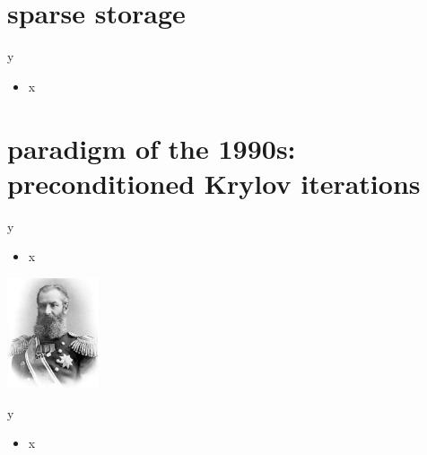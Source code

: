 \documentclass[10pt,
               svgnames,
               hyperref={colorlinks,citecolor=DeepPink4,linkcolor=FireBrick,urlcolor=Maroon},
               usepdftitle=false]{beamer}
\begin{document}
\section{sparse storage}

\begin{frame}{y}

\begin{itemize}
\item x
\end{itemize}
\end{frame}


\section{paradigm of the 1990s: preconditioned Krylov iterations}

\begin{frame}{y}

\begin{itemize}
\item x
\end{itemize}

\hfill \includegraphics[width=0.2\textwidth]{images/akrylov.jpg}
\end{frame}


\begin{frame}{y}

\begin{itemize}
\item x
\end{itemize}
\end{frame}
\end{document}

